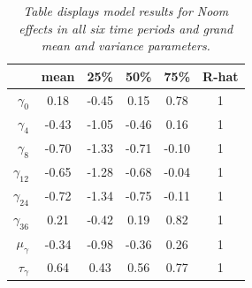 \documentclass{article}
\begin{document}
\begin{table}[H]
\centering
\begin{tabular}{r c c c c c}
  \hline
 & mean & 25\% & 50\% & 75\% & R-hat\\ 
  \hline
  $\gamma_0$ & 0.18 & -0.45 & 0.15 & 0.78 & 1   \\ 
  $\gamma_4$ & -0.43 & -1.05 & -0.46 & 0.16 & 1   \\ 
  $\gamma_8$ & -0.70 & -1.33 & -0.71 & -0.10   & 1\\  
  $\gamma_{12}$ & -0.65 & -1.28 & -0.68 & -0.04   & 1\\  
  $\gamma_{24}$ & -0.72 & -1.34 & -0.75 & -0.11  & 1\\  
  $\gamma_{36}$ & 0.21 & -0.42 & 0.19 & 0.82 & 1 \\ 
  \hline \hline
  $\mu_{\gamma}$ & -0.34 & -0.98 & -0.36 & 0.26  & 1\\ 
  $\tau_{\gamma}$ & 0.64 & 0.43 & 0.56 & 0.77  & 1\\ 
   \hline
\end{tabular}
\caption{\emph{Table displays model results for Noom effects in all six time periods and grand mean and variance parameters.}}
\end{table}
\end{document}
